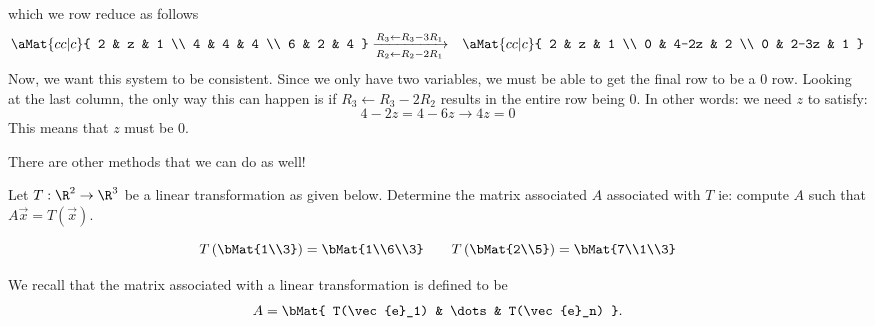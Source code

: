\documentclass[12pt,addpoints,answers]{exam}
\begin{document}
\begin{questions}
\begin{solution}
        which we row reduce as follows
        \begin{eqnarray*}
            \aMat{cc|c}{
            2 & z & 1 \\
            4 & 4 & 4 \\
            6 & 2 & 4
        } &\xrightarrow[R_2\gets R_2 - 2R_1]{R_3\gets R_3 - 3R_1}&\aMat{cc|c}{
            2 & z & 1 \\
            0 & 4-2z & 2 \\
            0 & 2-3z & 1
        }
        \end{eqnarray*}
        Now, we want this system to be consistent. Since we only have two variables, we must be able
        to get the final row to be a $0$ row. Looking at the last column, the only way this can happen
        is if $R_3\gets R_3 - 2R_2$ results in the entire row being $0$. In other words: we need $z$ to
        satisfy:
        \[
            4 - 2z = 4 - 6z \rightarrow 4z = 0
        \]
        This means that $z$ must be $0$.

        There are other methods that we can do as well!
    \end{solution}
    \newpage
    \question[15]
    Let $T:\R^2\rightarrow\R^3$ be a linear transformation as given below. Determine the matrix
    associated $A$ associated with $T$ ie: compute $A$ such that $A\vec{x} = T(\vec{x})$.

    \[
        T\left(\bMat{1\\3}\right) = \bMat{1\\6\\3} \qquad T\left(\bMat{2\\5}\right) = \bMat{7\\1\\3}
    \]
    \begin{solution}
        We recall that the matrix associated with a linear transformation is defined to be
        \[
            A = \bMat{ T(\vec{e}_1) & \dots & T(\vec{e}_n) }.
        \]


\end{solution}
\end{questions}
\end{document}
